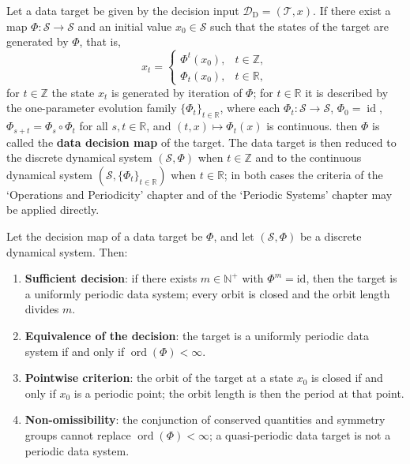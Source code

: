 \begin{definition}\label{def:data_periodization}
Let a data target be given by the decision input $\mathcal D_{\mathrm{D}}=(\mathcal T,x)$. If there exist a map $\Phi:\mathcal S\to\mathcal S$ and an initial value $x_0\in\mathcal S$ such that the states of the target are generated by $\Phi$, that is,
\[
x_t=\begin{cases}\Phi^t(x_0), & t\in\mathbb Z,\\ \Phi_t(x_0), & t\in\mathbb R,\end{cases}
\]
for $t\in\mathbb Z$ the state $x_t$ is generated by iteration of $\Phi$; for $t\in\mathbb R$ it is described by the one-parameter evolution family $\{\Phi_t\}_{t\in\mathbb R}$, where each $\Phi_t:\mathcal S\to\mathcal S$, $\Phi_0=\operatorname{id}$, $\Phi_{s+t}=\Phi_s\circ\Phi_t$ for all $s,t\in\mathbb R$, and $(t,x)\mapsto\Phi_t(x)$ is continuous.
then $\Phi$ is called the \textbf{data decision map} of the target. The data target is then reduced to the discrete dynamical system $(\mathcal S,\Phi)$ when $t\in\mathbb Z$ and to the continuous dynamical system $(\mathcal S,\{\Phi_t\}_{t\in\mathbb R})$ when $t\in\mathbb R$; in both cases the criteria of the `Operations and Periodicity' chapter and of the `Periodic Systems' chapter may be applied directly.
\end{definition}

\begin{theorem}\label{thm:data_periodicity_decision}
Let the decision map of a data target be $\Phi$, and let $(\mathcal S,\Phi)$ be a discrete dynamical system. Then:
\begin{enumerate}[label=(\Alph*)]
    \item \textbf{Sufficient decision}: if there exists $m\in\mathbb N^+$ with $\Phi^m=\mathrm{id}$, then the target is a uniformly periodic data system; every orbit is closed and the orbit length divides $m$.
    \item \textbf{Equivalence of the decision}: the target is a uniformly periodic data system if and only if $\operatorname{ord}(\Phi)<\infty$.
    \item \textbf{Pointwise criterion}: the orbit of the target at a state $x_0$ is closed if and only if $x_0$ is a periodic point; the orbit length is then the period at that point.
    \item \textbf{Non-omissibility}: the conjunction of conserved quantities and symmetry groups cannot replace $\operatorname{ord}(\Phi)<\infty$; a quasi-periodic data target is not a periodic data system.
\end{enumerate}
\end{theorem}


